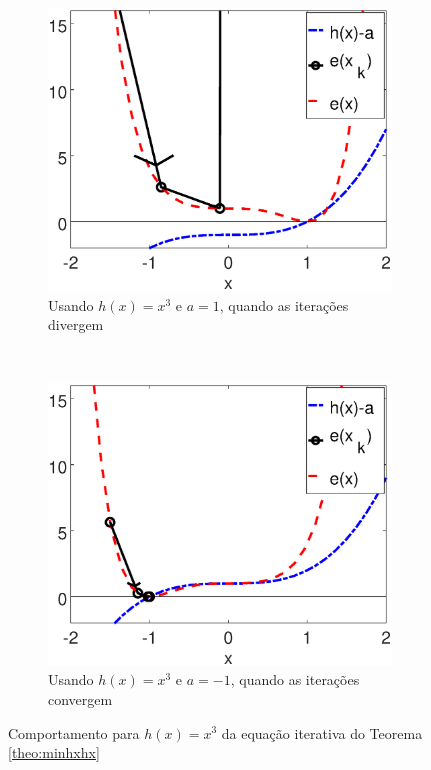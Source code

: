 \begin{figure}[!h]
    \centering
    \begin{subfigure}[b]{0.49\textwidth}
        \includegraphics[width=\textwidth]{chapters/minimization-hx/mfiles/hx3_a/minimizando_hx_a_1.eps}
        \caption{Usando $h(x)=x^3$ e $a=1$, quando as iterações divergem}
        \label{fig:hxacases3a}
    \end{subfigure}
    ~ %
    \begin{subfigure}[b]{0.49\textwidth}
        \includegraphics[width=\textwidth]{chapters/minimization-hx/mfiles/hx3_a/minimizando_hx_a_2.eps}
        \caption{Usando $h(x)=x^3$ e $a=-1$, quando as iterações convergem}
        \label{fig:hxacases3b}
    \end{subfigure}
    \caption{Comportamento para $h(x)=x^3$ da equação iterativa do Teorema \ref{theo:minhxhx}}
    \label{fig:hxacases3}
\end{figure}


